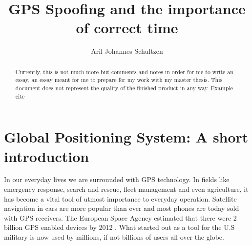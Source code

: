 \documentclass[12pt,english,a4paper]{article}
\title{GPS Spoofing and the importance of correct time}
\author{Aril Johannes Schultzen}
\begin{document}
\maketitle
\thispagestyle{empty}
\setcounter{page}{0}
\newpage
\tableofcontents
\thispagestyle{empty}
\setcounter{page}{0}
\newpage
\thispagestyle{empty}
\setcounter{page}{0}

\begin{abstract}
Currently, this is not much more but comments and notes in order for me to write an essay, an essay meant for me to prepare for my work with my master thesis. This document does not represent the quality of the finished product in any way. Example cite \cite{KandR}
\end{abstract}

\newpage
\clearpage
\setcounter{page}{1}

\section{Global Positioning System: A short introduction}
In our everyday lives we are surrounded with GPS technology. In fields like emergency response, search and rescue, fleet management and even agriculture, it has become a vital tool of utmost importance to everyday operation. Satellite navigation in cars are more popular than ever and most phones are today sold with GPS receivers. The European Space Agency estimated that there were 2 billion GPS enabled devices by 2012 \cite{ESA}. What started out as a tool for the U.S military is now used by millions, if not billions of users all over the globe.
\end{document}
